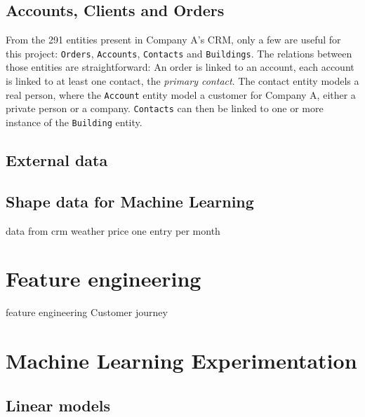 \subsection{Accounts, Clients and Orders}
From the 291 entities present in Company A's CRM, only a few are useful for this project: \texttt{Orders}, \texttt{Accounts}, \texttt{Contacts} and \texttt{Buildings}. The relations between those entities are straightforward: An order is linked to an account, each account is linked to at least one contact, the \textit{primary contact}. The contact entity models a real person, where the \texttt{Account} entity model a customer for Company A, either a private person or a company. \texttt{Contacts} can then be linked to one or more instance of the \texttt{Building} entity.

\label{caca}
{
\hskip-10.0cm
    \begin{table}[]
        \caption[DANNY The KING]{}
        \label{tab:my_label}
    \end{table}
}

\subsection{External data}

\subsection{Shape data for Machine Learning }
data from crm
weather
price
one entry per month



\section{Feature engineering} \label{sec:ml-features}

feature engineering
Customer journey




\section{Machine Learning Experimentation} \label{sec:ml-experimentation}
\lipsum[1]

\subsection{Linear models}
\lipsum[2]


